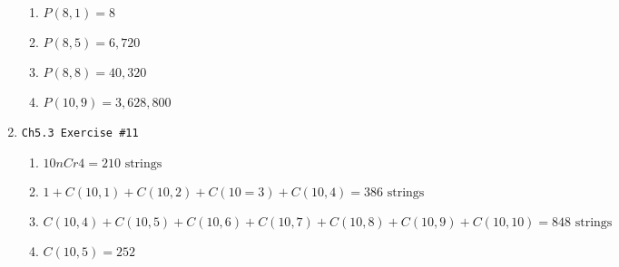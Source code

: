 \documentclass[11pt]{article}
\begin{document}
\begin{enumerate}
\begin{enumerate}
            \item $P(8,1) = 8$
            \item $P(8,5) = 6,720$
            \item $P(8,8) = 40,320$
            \item $P(10,9)= 3,628,800$
        \end{enumerate}
    \item \begin{verbatim}Ch5.3 Exercise #11\end{verbatim}
        \begin{enumerate}
            \item $10 nCr 4 = 210 \text{ strings}$
            \item $1 + C(10,1) + C(10,2) + C(10=3) + C(10,4) = 386 \text{ strings}$
            \item $C(10,4) + C(10,5) + C(10,6) + C(10,7) + C(10,8) + C(10,9) + C(10,10) = 848 \text{ strings}$
            \item $C(10,5) = 252$
        \end{enumerate}
    
    \newpage


\end{enumerate}
\end{document}
